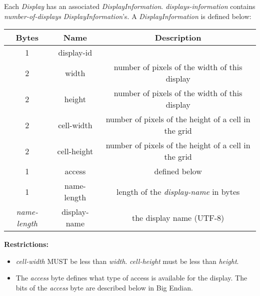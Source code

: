 \documentclass{article}
\begin{document}
    Each \emph{Display} has an associated \emph{DisplayInformation}. \emph{displays-information} contains \emph{number-of-displays} \emph{DisplayInformation}'s. A \emph{DisplayInformation} is defined below:

    \begin{center}
        \begin{tabular}{|c|c|c|}
            \hline
            \textbf{Bytes}     & \textbf{Name} & \textbf{Description}                                 \\
            \hline
            1                  & display-id    &                                                      \\
            \hline
            2                  & width         & number of pixels of the width of this display        \\
            \hline
            2                  & height        & number of pixels of the width of this display        \\
            \hline
            2                  & cell-width    & number of pixels of the height of a cell in the grid \\
            \hline
            2                  & cell-height   & number of pixels of the height of a cell in the grid \\
            \hline
            1                  & access        & defined below                                        \\
            \hline
            1                  & name-length   & length of the \emph{display-name} in bytes           \\
            \hline
            \emph{name-length} & display-name  & the display name (UTF-8)                             \\
            \hline
        \end{tabular}
    \end{center}

    \textbf{Restrictions:}

    \begin{itemize}
        \item \emph{cell-width} MUST be less than \emph{width}. \emph{cell-height} must be less than \emph{height}.\\ %
        \item The \emph{access} byte defines what type of access is available for the display. The bits of the \emph{access} byte are described below in Big Endian.
    \end{itemize}
\end{document}
